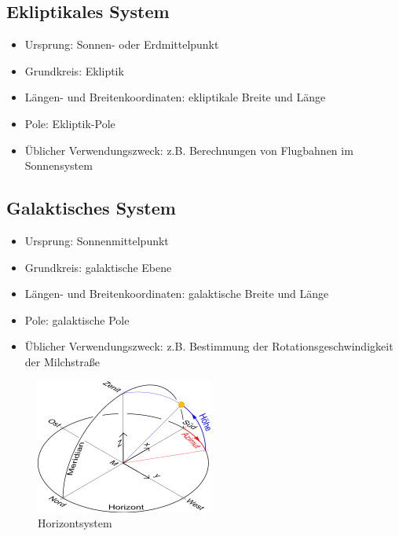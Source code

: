 \documentclass[titlepage]{scrartcl}
\begin{document}
\subsection{Ekliptikales System}

\begin{itemize}
\item Ursprung: Sonnen- oder Erdmittelpunkt
\item Grundkreis: Ekliptik
\item Längen- und Breitenkoordinaten: ekliptikale Breite und Länge
\item Pole: Ekliptik-Pole
\item Üblicher Verwendungszweck: z.B. Berechnungen von Flugbahnen im Sonnensystem
\end{itemize}

\subsection{Galaktisches System}

\begin{itemize}
\item Ursprung: Sonnenmittelpunkt
\item Grundkreis: galaktische Ebene
\item Längen- und Breitenkoordinaten: galaktische Breite und Länge
\item Pole: galaktische Pole
\item Üblicher Verwendungszweck: z.B. Bestimmung der Rotationsgeschwindigkeit der Milchstraße
\end{itemize}

\begin{figure}
        \includegraphics[width=.9\textwidth]{images/Horizontsystem}
\caption{ Horizontsystem }
\label{fig:Horizontsystem}
\end{figure}
\end{document}
